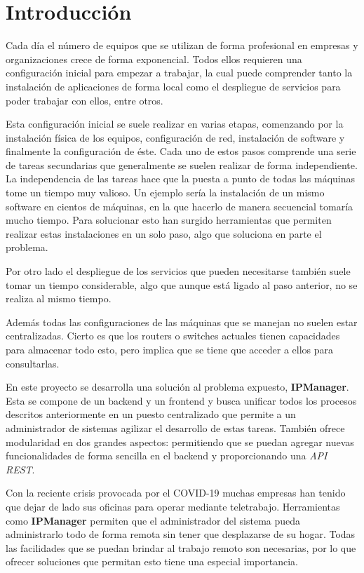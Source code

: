 \chapter{Introducción}


Cada día el número de equipos que se utilizan de forma profesional en empresas y organizaciones crece de forma exponencial. Todos ellos requieren una configuración inicial para empezar a trabajar, la cual puede comprender tanto la instalación de aplicaciones de forma local como el despliegue de servicios para poder trabajar con ellos, entre otros.

Esta configuración inicial se suele realizar en varias etapas, comenzando por la instalación física de los equipos, configuración de red, instalación de software y finalmente la configuración de éste. Cada uno de estos pasos comprende una serie de tareas secundarias que generalmente se suelen realizar de forma independiente. La independencia de las tareas hace que la puesta a punto de todas las máquinas tome un tiempo muy valioso. Un ejemplo sería la instalación de un mismo software en cientos de máquinas, en la que hacerlo de manera secuencial tomaría mucho tiempo. Para solucionar esto han surgido herramientas que permiten realizar estas instalaciones en un solo paso, algo que soluciona en parte el problema.

Por otro lado el despliegue de los servicios que pueden necesitarse también suele tomar un tiempo considerable, algo que aunque está ligado al paso anterior, no se realiza al mismo tiempo.

Además todas las configuraciones de las máquinas que se manejan no suelen estar centralizadas. Cierto es que los routers o switches actuales tienen capacidades para almacenar todo esto, pero implica que se tiene que acceder a ellos para consultarlas.

En este proyecto se desarrolla una solución al problema expuesto, \textbf{IPManager}. Esta se compone de un backend y un frontend y busca unificar todos los procesos descritos anteriormente en un puesto centralizado que permite a un administrador de sistemas agilizar el desarrollo de estas tareas. También ofrece modularidad en dos grandes aspectos: permitiendo que se puedan agregar nuevas funcionalidades de forma sencilla en el backend y proporcionando una \textit{API REST}.

Con la reciente crisis provocada por el COVID-19 muchas empresas han tenido que dejar de lado sus oficinas para operar mediante teletrabajo. Herramientas como \textbf{IPManager} permiten que el administrador del sistema pueda administrarlo todo de forma remota sin tener que desplazarse de su hogar. Todas las facilidades que se puedan brindar al trabajo remoto son necesarias, por lo que ofrecer soluciones que permitan esto tiene una especial importancia.

